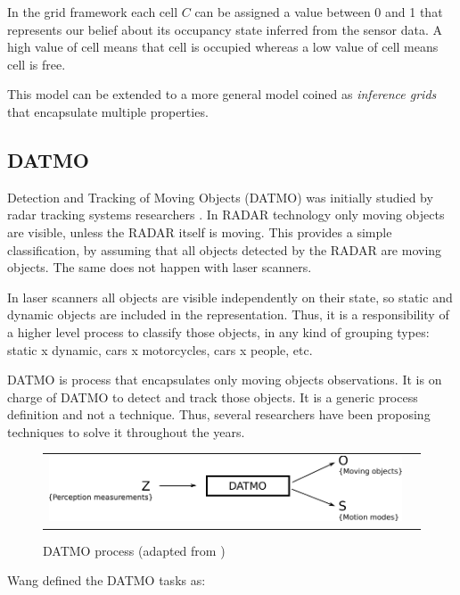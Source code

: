 In the grid framework each cell $C$ can be assigned a value between 0 and 1 that represents our belief about its occupancy state inferred from the sensor data. A high value of cell means that cell is occupied whereas a low value of cell means cell is free.

This model can be extended to a more general model coined as \textit{inference grids} that encapsulate multiple properties\cite{Elfes:1989:OGP:916528}.

\subsection{DATMO}

Detection and Tracking of Moving Objects (DATMO) was initially studied by radar tracking systems researchers \cite{qadeerthesis}. In RADAR technology only moving objects are visible, unless the RADAR itself is moving. This provides a simple classification, by assuming that all objects detected by the RADAR are moving objects. The same does not happen with laser scanners. 

In laser scanners all objects are visible independently on their state, so static and dynamic objects are included in the representation. Thus, it is a responsibility of a higher level process to classify those objects, in any kind of grouping types: static x dynamic, cars x motorcycles, cars x people, etc.

DATMO is process that encapsulates only moving objects observations. It is on charge of DATMO to detect and track those objects. It is a generic process definition and not a technique. Thus, several researchers have been proposing techniques to solve it throughout the years.

\begin{figure}[h]
   \centering
     \begin{tabular}{lr}
       \includegraphics[scale=1.0]{img/fig:datmo:process}
     \end{tabular}
   \caption{DATMO process (adapted from \cite{Wang04a})}
   \label{fig:datmo:process}
 \end{figure}

Wang \cite{Wang03onlinesimultaneous} defined the DATMO tasks as:

